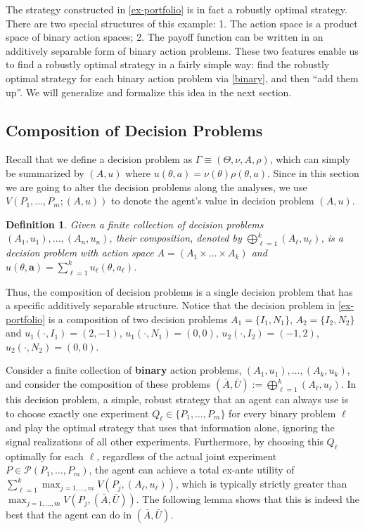 \documentclass[11pt]{article}
\theoremstyle{plain}
\newtheorem{defn}{Definition}
\theoremstyle{remark}
\begin{document}
The strategy constructed in \autoref{ex-portfolio} is in fact a robustly optimal strategy. There are two special structures of this example: 1. The action space is a product space of binary action spaces; 2. The payoff function can be written in an additively separable form of binary action problems. These two features enable us to find a robustly optimal strategy in a fairly simple way: find the robustly optimal strategy for each binary action problem via \autoref{binary}, and then ``add them up''. We will generalize and formalize this idea in the next section.




\subsection{Composition of Decision Problems}\label{sec:composition}

Recall that we define a decision problem as $\Gamma\equiv (\Theta,\nu,A,\rho)$, which can simply be summarized by $(A,u)$ where $u(\theta,a)=\nu(\theta)\rho(\theta,a)$. Since in this section we are going to alter the decision problems along the analyses, we use $V(P_1,...,P_m;(A,u))$ to denote the agent's value in decision problem $(A,u)$.



\begin{defn}
Given a finite collection of decision problems $(A_1,u_1),...,(A_n,u_n)$, their composition, denoted by $\bigoplus_{\ell=1}^k (A_\ell,u_\ell)$, is a decision problem with action space $A=(A_1\times\ldots\times A_k)$ and $u(\theta,\mathbf{a})=\sum_{\ell=1}^k u_\ell(\theta,a_\ell)$.
\end{defn}

Thus, the composition of decision problems is a single decision problem that has a specific additively separable structure. Notice that the decision problem in \autoref{ex-portfolio} is a composition of two decision problems $A_1=\{I_1,N_1\}$, $A_2=\{I_2,N_2\}$ and $u_1(\cdot,I_1)=(2,-1)$, $u_1(\cdot,N_1)=(0,0)$, $u_2(\cdot,I_2)=(-1,2)$, $u_2(\cdot,N_2)=(0,0)$.






Consider a finite collection of \textbf{binary} action problems, $(A_1, u_1), \ldots , (A_k, u_k)$, and consider the composition of these problems $(\bar{A}, \bar{U}) := \bigoplus_{\ell = 1}^k (A_\ell, u_\ell)$.  In this decision problem, a simple, robust strategy that an agent can always use is to choose exactly one experiment $Q_\ell \in \{P_1, \ldots , P_m\}$ for every binary problem $\ell$ and play the optimal strategy that uses that information alone, ignoring the signal realizations of all other experiments.  Furthermore, by choosing this $Q_\ell$ optimally for each $\ell$, regardless of the actual joint experiment $P \in \mathcal{P}(P_1, \ldots , P_m)$,  the agent can achieve a total ex-ante utility of $\sum_{\ell = 1}^{k} \max_{j = 1, \ldots , m}V(P_j, (A_\ell, u_\ell))$,  which is typically strictly greater than $\max_{j  = 1, \ldots , m} V(P_j, (\bar{A}, \bar{U}))$.
The following lemma shows that this is indeed the best that the agent can do in $(\bar{A}, \bar{U})$.
\end{document}

